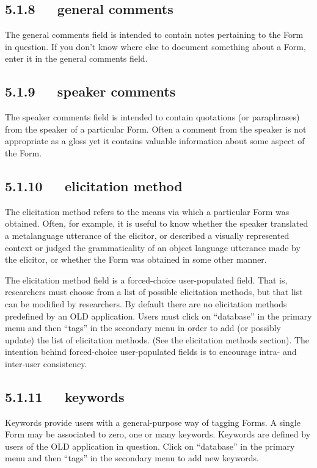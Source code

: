 \documentclass[letterpaper,10pt,english]{sphinxmanual}
\begin{document}
\subsection{5.1.8   general comments}
\label{user_guide:general-comments}
The general comments field is intended to contain notes pertaining to the Form
in question.  If you don't know where else to document something about a Form,
enter it in the general comments field.


\subsection{5.1.9   speaker comments}
\label{user_guide:speaker-comments}
The speaker comments field is intended to contain quotations (or paraphrases)
from the speaker of a particular Form.  Often a comment from the speaker is
not appropriate as a gloss yet it contains valuable information about some
aspect of the Form.


\subsection{5.1.10   elicitation method}
\label{user_guide:elicitation-method}
The elicitation method refers to the means via which a particular Form was
obtained.  Often, for example, it is useful to know whether the speaker
translated a metalanguage utterance of the elicitor, or described a visually
represented context or judged the grammaticality of an object language utterance
made by the elicitor, or whether the Form was obtained in some other manner.

The elicitation method field is a forced-choice user-populated field.  That is,
researchers must choose from a list of possible elicitation methods, but that
list can be modified by researchers.  By default there are no elicitation
methods predefined by an OLD application.  Users must click on ``database'' in the
primary menu and then ``tags'' in the secondary menu in order to add (or possibly
update) the list of elicitation methods.  (See the elicitation methods section).
The intention behind forced-choice user-populated fields is to encourage intra-
and inter-user consistency.


\subsection{5.1.11   keywords}
\label{user_guide:keywords}
Keywords provide users with a general-purpose way of tagging Forms.  A single
Form may be associated to zero, one or many keywords.  Keywords are defined by
users of the OLD application in question.  Click on ``database'' in the primary
menu and then ``tags'' in the secondary menu to add new keywords.
\end{document}
